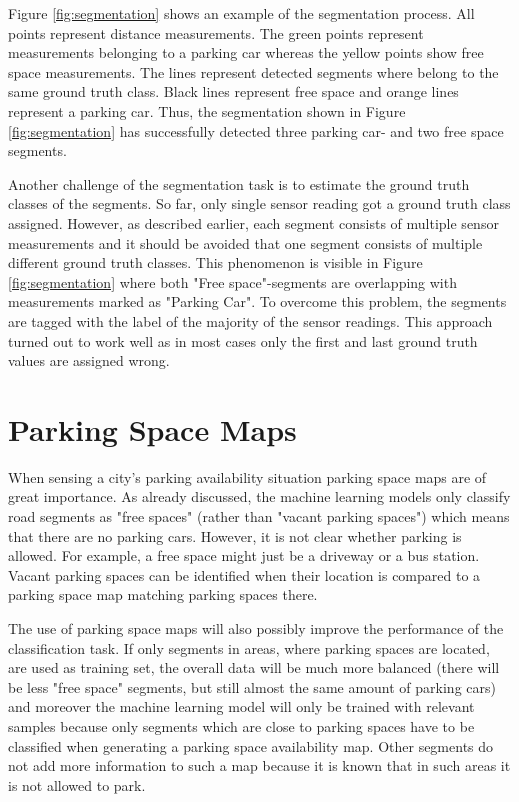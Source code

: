 Figure \ref{fig:segmentation} shows an example of the segmentation process. All points represent distance measurements. The green points represent measurements belonging to a parking car whereas the yellow points show free space measurements. The lines represent detected segments where belong to the same ground truth class. Black lines represent free space and orange lines represent a parking car. Thus, the segmentation shown in Figure \ref{fig:segmentation} has successfully detected three parking car- and two free space segments. 

Another challenge of the segmentation task is to estimate the ground truth classes of the segments. So far, only single sensor reading got a ground truth class assigned. However, as described earlier, each segment consists of multiple sensor measurements and it should be avoided that one segment consists of multiple different ground truth classes. This phenomenon is visible in Figure \ref{fig:segmentation} where both "Free space"-segments are overlapping with measurements marked as "Parking Car". To overcome this problem, the segments are tagged with the label of the majority of the sensor readings. This approach turned out to work well as in most cases only the first and last ground truth values are assigned wrong. 







\section{Parking Space Maps}
\label{sec:parking_space_maps}

When sensing a city's parking availability situation parking space maps are of great importance. As already discussed, the machine learning models only classify road segments as "free spaces" (rather than "vacant parking spaces") which means that there are no parking cars. However, it is not clear whether parking is allowed. For example, a free space might just be a driveway or a bus station. Vacant parking spaces can be identified when their location is compared to a parking space map matching parking spaces there. 

The use of parking space maps will also possibly improve the performance of the classification task. If only segments in areas, where parking spaces are located, are used as training set, the overall data will be much more balanced (there will be less "free space" segments, but still almost the same amount of parking cars) and moreover the machine learning model will only be trained with relevant samples because only segments which are close to parking spaces have to be classified when generating a parking space availability map. Other segments do not add more information to such a map because it is known that in such areas it is not allowed to park.

